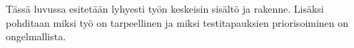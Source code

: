 Tässä luvussa esitetään lyhyesti työn keskeisin sisältö ja rakenne.
Lisäksi pohditaan miksi työ on tarpeellinen ja miksi testitapauksien priorisoiminen on ongelmallista.
